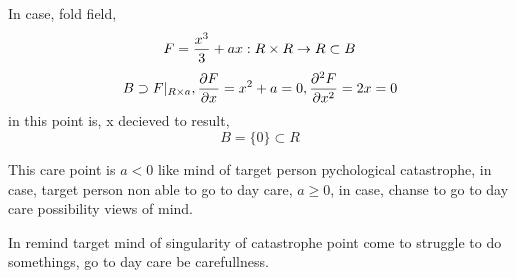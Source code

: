 \documentclass{jsarticle}
\begin{document}
	In case, fold field,
	$$ F = {x^3 \over 3} + ax : R \times R \to R \subset B $$
	$$ B \supset F|_{R \times a}, {{\partial F} \over {\partial x}}
	= x^2 + a = 0, {{\partial^2 F} \over {\partial x^2}} = 2 x = 0 $$
	in this point is,
	x decieved to result, 
	$$ B = \{0\} \subset R $$

	This care point is $ a < 0 $ like mind of target person pychological
	catastrophe, in case, target person non able to go to day care,
	$ a \ge 0 $, in case, chanse to go to day care possibility views of
	mind.

	In remind target mind of singularity of catastrophe point come to
	struggle to do somethings, go to day care be carefullness.
\end{document}

